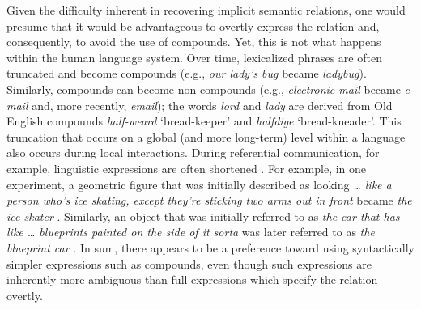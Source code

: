 \documentclass[output=paper]{langsci/langscibook}
\begin{document}
Given the difficulty inherent in recovering implicit semantic
relations, one would presume that it would be advantageous to overtly
express the relation and, consequently, to avoid the use of
compounds. Yet, this is not what happens within the human language
system. Over time, lexicalized phrases are often truncated and become
compounds (e.g., \textit{our lady’s bug} became
\textit{ladybug}). Similarly, compounds can become non-compounds
(e.g., \textit{electronic mail} became \textit{e-mail} and, more
recently, \textit{email}); the words \textit{lord} and \textit{lady}
are derived from Old English compounds \textit{half-weard}
`bread-keeper' and \textit{halfdige} `bread-kneader'. This truncation
that occurs on a global (and more long-term) level within a language
also occurs during local interactions.  During referential
communication, for example, linguistic expressions are often shortened
\citep{garrod1987saying,brennan1996conceptual}. For example, in one
experiment, a geometric figure that was initially described as looking
\textit{\ldots{} like a person who’s ice skating, except they’re sticking two
arms out in front} became \textit{the ice skater}
\citep{clark1986referring}. Similarly, an object that was initially
referred to as \textit{the car that has like \ldots{} blueprints painted on the
side of it sorta} was later referred to as \textit{the blueprint car}
\citep{metzing2003conceptual}. In sum, there appears to be a
preference toward using syntactically simpler expressions such as
compounds, even though such expressions are inherently more ambiguous
than full expressions which specify the relation overtly.
\end{document}
